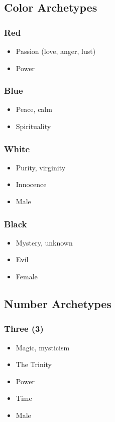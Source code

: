 \documentclass[11pt]{article}
\begin{document}
\subsection*{Color Archetypes}
\label{sec:org56f787d}

\subsubsection*{Red}
\label{sec:org519a47a}
\begin{itemize}
\item Passion (love, anger, lust)
\item Power
\end{itemize}

\subsubsection*{Blue}
\label{sec:orgac50927}
\begin{itemize}
\item Peace, calm
\item Spirituality
\end{itemize}

\subsubsection*{White}
\label{sec:orgfe2d309}
\begin{itemize}
\item Purity, virginity
\item Innocence
\item Male
\end{itemize}

\subsubsection*{Black}
\label{sec:orga7949f2}
\begin{itemize}
\item Mystery, unknown
\item Evil
\item Female
\end{itemize}

\subsection*{Number Archetypes}
\label{sec:org9d21429}

\subsubsection*{Three (3)}
\label{sec:org67f5e85}
\begin{itemize}
\item Magic, mysticism
\item The Trinity
\item Power
\item Time
\item Male
\end{itemize}
\end{document}
